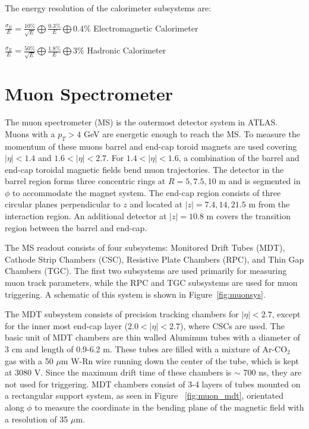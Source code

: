 The energy resolution of the calorimeter subsystems are:

$\frac{\sigma_{E}}{E}=\frac{10\%}{\sqrt{E}}\bigoplus \frac{0.3\%}{E}\bigoplus 0.4\%$ Electromagnetic Calorimeter

$\frac{\sigma_{E}}{E}=\frac{50\%}{\sqrt{E}}\bigoplus \frac{1.8\%}{E}\bigoplus 3\%$ Hadronic Calorimeter


\section{Muon Spectrometer}
The muon spectrometer (MS) is the outermost detector system in ATLAS. Muons with a $p_{T}>4$ GeV are energetic enough to reach the MS. To measure the momentum of these muons barrel and end-cap toroid magnets are used covering $|\eta| < 1.4$ and $1.6<|\eta|<2.7$. For $1.4 < |\eta| < 1.6$, a combination of the barrel and end-cap toroidal magnetic fields bend muon trajectories. The detector in the barrel region forms three concentric rings at $R=5, 7.5, 10$ m and is segmented in $\phi$ to accommodate the magnet system. The end-cap region consists of three circular planes perpendicular to $z$ and located at $|z|=7.4, 14, 21.5$ m from the interaction region. An additional detector at $|z|=10.8$ m covers the transition region between the barrel and end-cap.

The MS readout consists of four subsystems: Monitored Drift Tubes (MDT), Cathode Strip Chambers (CSC), Resistive Plate Chambers (RPC), and Thin Gap Chambers (TGC). The first two subsystems are used primarily for measuring muon track parameters, while the RPC and TGC subsystems are used for muon triggering. A schematic of this system is shown in Figure~\ref{fig:muonsys}. 

The MDT subsystem consists of precision tracking chambers for $|\eta|<2.7$, except for the inner most end-cap layer ($2.0 < |\eta| < 2.7$), where CSCs are used. The basic unit of MDT chambers are thin walled Aluminum tubes with a diameter of 3 cm and length of 0.9-6.2 m. These tubes are filled with a mixture of Ar-CO$_{2}$ gas with a  50 $\mu$m W-Rn wire running down the center of the tube, which is kept at 3080 V. Since the maximum drift time of these chambers is $\sim$ 700 ns, they are not used for triggering. MDT chambers consist of 3-4 layers of tubes mounted on a rectangular support system, as seen in Figure ~\ref{fig:muon_mdt}, orientated along $\phi$ to measure the coordinate in the bending plane of the magnetic field with a resolution of 35 $\mu$m.

